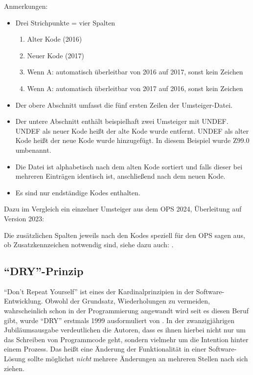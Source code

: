 Anmerkungen: 
\begin{itemize}
\item Drei Strichpunkte = vier Spalten
\begin{enumerate}
\item Alter Kode (2016)
\item Neuer Kode (2017)
\item Wenn A: automatisch überleitbar von 2016 auf 2017, sonst kein Zeichen
\item Wenn A: automatisch überleitbar von 2017 auf 2016, sonst kein Zeichen
\end{enumerate}
\item Der obere Abschnitt umfasst die fünf ersten Zeilen der Umsteiger-Datei. 
\item Der untere Abschnitt enthält beispielhaft zwei Umsteiger mit UNDEF. UNDEF als neuer Kode heißt der alte Kode wurde entfernt. UNDEF als alter Kode heißt der neue Kode wurde hinzugefügt. In diesem Beispiel wurde Z99.0 umbenannt. 
\item Die Datei ist alphabetisch nach dem alten Kode sortiert und falls dieser bei mehreren Einträgen identisch ist, anschließend nach dem neuen Kode.
\item Es sind nur endständige Kodes enthalten. 
\end{itemize}

Dazu im Vergleich ein einzelner Umsteiger aus dem OPS 2024, Überleitung auf Version 2023:


Die zusätzlichen Spalten jeweils nach den Kodes speziell für den OPS sagen aus, ob Zusatzkennzeichen notwendig sind, siehe dazu auch: \cite[Kategorie und Kode im OPS]{bfarmopskk}.

\subsection{"`DRY"'-Prinzip}

"`Don't Repeat Yourself"' ist eines der Kardinalprinzipien in der Software-Entwicklung. Obwohl der Grundsatz, Wiederholungen zu vermeiden, wahrscheinlich schon in der Programmierung angewandt wird seit es diesen Beruf gibt, wurde "`DRY"' erstmals 1999 ausformuliert von \cite[Seite 79ff]{thomas2019pragmatic}. In der zwanzigjährigen Jubiläumsausgabe verdeutlichen die Autoren, dass es ihnen hierbei nicht nur um das Schreiben von Programmcode geht, sondern vielmehr um die Intention hinter einem Prozess. Das heißt eine Änderung der Funktionalität in einer Software-Lösung sollte möglichst \emph{nicht} mehrere Änderungen an mehreren Stellen nach sich ziehen. 

